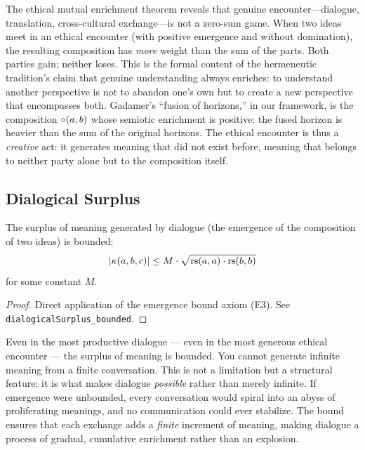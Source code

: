 \begin{interpretation}
The ethical mutual enrichment theorem reveals that genuine encounter---dialogue, translation, cross-cultural exchange---is not a zero-sum game. When two ideas meet in an ethical encounter (with positive emergence and without domination), the resulting composition has \emph{more} weight than the sum of the parts. Both parties gain; neither loses. This is the formal content of the hermeneutic tradition's claim that genuine understanding always enriches: to understand another perspective is not to abandon one's own but to create a new perspective that encompasses both. Gadamer's ``fusion of horizons,'' in our framework, is the composition $\circ(a, b)$ whose semiotic enrichment is positive: the fused horizon is heavier than the sum of the original horizons. The ethical encounter is thus a \emph{creative} act: it generates meaning that did not exist before, meaning that belongs to neither party alone but to the composition itself.
\end{interpretation}

\subsection{Dialogical Surplus}

\begin{theorem}
\label{thm:dialogical-bounded}
The surplus of meaning generated by dialogue (the emergence of the
composition of two ideas) is bounded:
\[
  |\kappa(a, b, c)| \leq M \cdot \sqrt{\mathrm{rs}(a,a) \cdot \mathrm{rs}(b,b)}
\]
for some constant $M$.
\end{theorem}

\begin{proof}
Direct application of the emergence bound axiom (E3). See
\texttt{dialogicalSurplus\_bounded}.
\end{proof}

\begin{interpretation}
Even in the most productive dialogue --- even in the most generous
ethical encounter --- the surplus of meaning is bounded. You cannot
generate infinite meaning from a finite conversation. This is not a
limitation but a structural feature: it is what makes dialogue
\emph{possible} rather than merely infinite. If emergence were
unbounded, every conversation would spiral into an abyss of
proliferating meanings, and no communication could ever stabilize.
The bound ensures that each exchange adds a \emph{finite} increment
of meaning, making dialogue a process of gradual, cumulative
enrichment rather than an explosion.
\end{interpretation}

